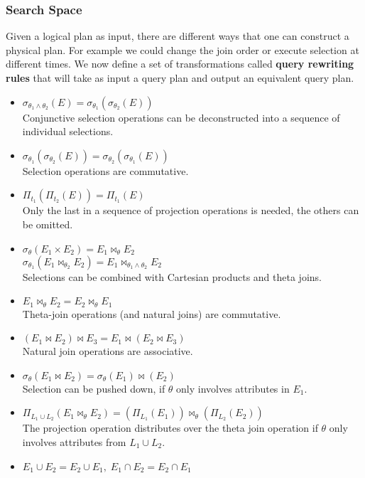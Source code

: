 \subsubsection{Search Space}
Given a logical plan as input, there are different ways that one can construct a physical plan. For example we could change the join order or execute selection at different times. We now define a set of transformations called \textbf{query rewriting rules} that will take as input a query plan and output an equivalent query plan.
\begin{itemize}
\item $\sigma_{\theta_1 \land \theta_2}(E) = \sigma_{\theta_1}(\sigma_{\theta_2} (E))$\\
Conjunctive selection operations can be deconstructed into a sequence of individual selections.
\item $\sigma_{\theta_1}(\sigma_{\theta_2}(E)) = \sigma_{\theta_2}(\sigma_{\theta_1}(E))$\\
Selection operations are commutative.
\item $\Pi_{t_1}(\Pi_{t_2}(E)) = \Pi_{t_1}(E)$\\
Only the last in a sequence of projection operations is needed, the others can be omitted.
\item $\sigma_\theta(E_1 \times E_2) = E_1 \Join_\theta E_2$\\
$\sigma_{\theta_1}(E_1 \Join_{\theta_2} E_2) = E_1 \Join_{\theta_1 \land \theta_2} E_2$\\
Selections can be combined with Cartesian products and theta joins.
\item $E_1 \Join_\theta E_2 = E_2 \Join_\theta E_1$\\
Theta-join operations (and natural joins) are commutative.
\item $(E_1 \Join E_2) \Join E_3 = E_1 \Join (E_2 \Join E_3)$\\
Natural join operations are associative.
\item $\sigma_\theta (E_1 \Join E_2) = \sigma_\theta(E_1) \Join (E_2)$\\
Selection can be pushed down, if $\theta$ only involves attributes in $E_1$.
\item $\Pi_{L_1 \cup L_2}(E_1 \Join_\theta E_2) = (\Pi_{L_1}(E_1)) \Join_\theta (\Pi_{L_2}(E_2))$\\
The projection operation distributes over the theta join operation if $\theta$ only involves attributes from $L_1 \cup L_2$.
\item $E_1 \cup E_2 = E_2 \cup E_1, \; E_1 \cap E_2 = E_2 \cap E_1$\\

\end{itemize}
